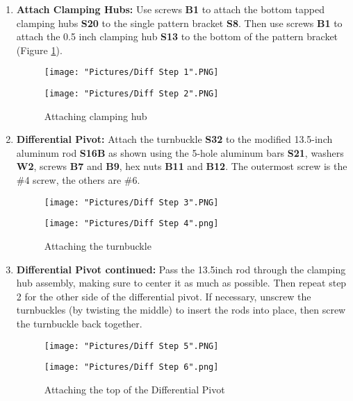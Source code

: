 \documentclass[12pt]{article}
\begin{document}
\begin{enumerate}
\item \textbf{Attach Clamping Hubs:} Use screws \textbf{B1} to attach the bottom tapped clamping hubs \textbf{S20} to the single pattern bracket \textbf{S8}. Then use screws \textbf{B1} to attach the 0.5 inch clamping hub \textbf{S13} to the bottom of the pattern bracket (Figure \ref{attaching clamping hub}).

\begin{figure}[H]
  \centering
  \begin{minipage}[b]{0.45\textwidth}
    \texttt{[image: "Pictures/Diff Step 1".PNG]}
  \end{minipage}
  \hfill
  \begin{minipage}[b]{0.45\textwidth}
    \texttt{[image: "Pictures/Diff Step 2".PNG]}
  \end{minipage}
  \caption{Attaching clamping hub}
  \label{attaching clamping hub}
\end{figure}

\item \textbf{Differential Pivot:} Attach the turnbuckle \textbf{S32} to the modified 13.5-inch aluminum rod \textbf{S16B} as shown using the 5-hole aluminum bars \textbf{S21}, washers \textbf{W2}, screws \textbf{B7} and \textbf{B9}, hex nuts \textbf{B11} and \textbf{B12}. The outermost screw is the \#4 screw, the others are \#6.

\begin{figure}[H]
  \centering
  \begin{minipage}[b]{0.45\textwidth}
    \texttt{[image: "Pictures/Diff Step 3".PNG]}
  \end{minipage}
  \hfill
  \begin{minipage}[b]{0.45\textwidth}
    \texttt{[image: "Pictures/Diff Step 4".png]}
  \end{minipage}
  \caption{Attaching the turnbuckle}
\end{figure}

\item \textbf{Differential Pivot continued:} Pass the 13.5inch rod through the clamping hub assembly, making sure to center it as much as possible. Then repeat step 2 for the other side of the differential pivot. If necessary, unscrew the turnbuckles (by twisting the middle) to insert the rods into place, then screw the turnbuckle back together. 

\begin{figure}[H]
  \centering
  \begin{minipage}[b]{0.45\textwidth}
    \texttt{[image: "Pictures/Diff Step 5".PNG]}
  \end{minipage}
  \hfill
  \begin{minipage}[b]{0.45\textwidth}
    \texttt{[image: "Pictures/Diff Step 6".png]}
  \end{minipage}
  \caption{Attaching the top of the Differential Pivot}
\end{figure}


\end{enumerate}
\end{document}
